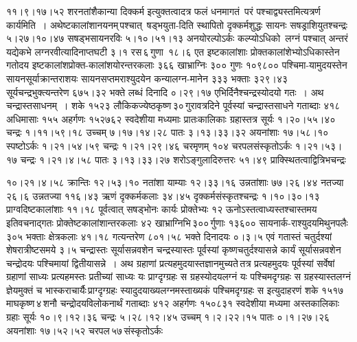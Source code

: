 \documentclass[11pt, openany]{book}
\begin{document}
\newpage

\begin{sloppypar}
\noindent ११।९।१७।५२ शरनतांशैकान्या दिक्कर्म इत्युक्तत्वादत्र फलं धनमागतं~परं पश्चाद्व्यस्तमित्यत्रर्ण कार्यमिति~। अथेष्टकालांशानयनम्\textendash \,पश्चात्~षड्भयुता-दिति स्थापितो दृक्कर्मशुद्धः सायनः सषड्राशियुतश्चन्द्रः ५।२७।१०।४७ सषड्भसायनरविः ५।१०।५१।१३ अनयोरल्पोऽर्कः कल्प्योऽधिको~लग्नं पश्चात् अन्तरं यद्येकभे लग्नरवीत्यादिनाप्तघटी ३।१ रस\textendash \,६\textendash \,गुणा~१८।६ एत इष्टकालांशाः प्रोक्तकालांशेभ्योऽधिकास्तेन गतोदय इष्टकालांशप्रोक्त-कालांशयोरन्तरकलाः ३६६ खाभ्राग्निः ३०० गुणः १०९८०० पश्चिमा-यामुदयस्तेन सायनसूर्याक्रान्तराशयः सायनसप्तमराश्युदयेन कन्यालग्न-मानेन ३३३ भक्ताः ३२९।४३ सूर्यचन्द्रभुक्त्यन्तरेण ६७५।३२ भक्ते लब्धं दिनादि ०।२९।१७ एभिर्दिनैश्चन्द्रस्योदयो गतः~। अथ चन्द्रास्तसाधनम्~। शके १५२३ लौकिकज्येष्ठकृष्ण\textendash \,३०\textendash \,गुरावत्रदिने पूर्वस्यां चन्द्रास्तसाधने गताब्दाः ४१८ अधिमासाः १५५ अहर्गणः १५२७६२ स्वदेशीया मध्यमाः प्रातःकालिकाः ग्रहास्तत्र सूर्यः १।२०।५५।४० चन्द्रः १।११।५९।१८ उच्चम् ७।१७।१४।२८ पातः ३।१३।३३।३२ अयनांशाः १७।५८।१० स्पष्टोऽर्कः १।२१।५४।५९ चन्द्रः १।२१।२९।४६ चरमृणम् १०४ चरपलसंस्कृतोऽर्कः १।२१।५३।१७ चन्द्रः १।२१।४।५८ पातः ३।१३।३३।२७ शरोऽङ्गुलादिरुत्तरः ५१।४९ प्राक्स्थितत्वाद्वित्रिभचन्द्रः
\end{sloppypar}

\newpage

\begin{sloppypar}
\noindent १०।२१।४।५८ क्रान्तिः १२।५३।१० नतांशा याम्याः १२।३३।१६ उन्नतांशाः ७७।२६।४४ नतज्या २६।६ उन्नतज्या ११६।४३ ऋणं दृक्कर्मकलाः ३४।४५ दृक्कर्मसंस्कृतश्चन्द्रः १।१०।३०।१३ प्राग्वदिष्टकालांशाः ११।१८ पूर्वत्वात् सषड्भोनः कार्यः प्रोक्तेभ्यः १२ ऊनोऽस्तत्वाध्यस्तश्चास्तमय इतिवचनाद्गतः प्रोक्तेष्टकालांशान्तरकलाः ४२ खाभ्राग्निभि\textendash \,३००\textendash \,र्गुणाः १३६०० सायनार्क-राश्युदयमिथुनपलैः ३०५ भक्ताः क्षेत्रकलाः ४१।१८ गत्यन्तरेण ८०१।५८ भक्ते दिनादयः ०।३।५ एवं गतास्तं चतुर्दश्यां शेषरात्रीष्टसमये ३।५ चन्द्रास्तः सूर्यासन्नवशेन चन्द्रस्यास्तः पूर्वस्यां कृष्णचतुर्दश्यासन्ने कार्यं सूर्यासन्नवशेन चन्द्रोदयः पश्चिमायां द्वितीयासन्ने~। अथ ग्रहाणां प्रत्यहमुदयास्तज्ञानमुच्यते\textendash \,तत्र प्रत्यहमुदयः पूर्वस्यां सर्वेषां ग्रहाणां साध्यः प्रत्यहमस्तः प्रतीच्यां साध्यः यः प्राग्दृग्ग्रहः स ग्रहस्योदयलग्नं यः पश्चिमदृग्ग्रहः स ग्रहस्यास्तलग्नं ज्ञेयमुक्तं च {\color{violet}भास्कराचार्यैः\textendash \,प्राग्दृग्ग्रहः स्यादुदयाख्यलग्नमस्ताख्यकं पश्चिमदृग्ग्रहः स} इत्युदाहरणं शके १५१७ माघकृष्ण\textendash \,४\textendash \,शनौ चन्द्रोदयविलोकनार्थं गताब्दाः ४१२ अहर्गणः १५०८३१ स्वदेशीया मध्यमा अस्तकालिकाः ग्रहाः सूर्यः १०।९।१२।३६ चन्द्रः ५।२८।१२।४५ उच्चम् १।२।२२।१५ पातः ०।१।२७।२६ अयनांशाः १७।५२।५२ चरपल\textendash \,५७\textendash \,संस्कृतोऽर्कः
\end{sloppypar}
\end{document}
